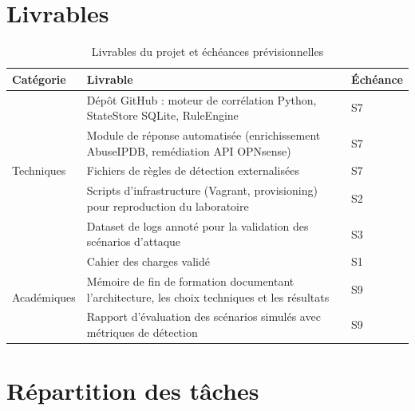 \documentclass[a4paper,12pt]{article}
\begin{document}
\section{Livrables}

\begin{table}[H]
\centering
\small
\renewcommand{\arraystretch}{1.4}
\begin{tabular}{|p{}|p{}|p{}|}
\hline
\textbf{Catégorie} & \textbf{Livrable} & \textbf{Échéance} \\
\hline
\multirow{5}{*}{Techniques}
 & Dépôt GitHub : moteur de corrélation Python, StateStore SQLite, RuleEngine & S7 \\
\cline{2-3}
 & Module de réponse automatisée (enrichissement AbuseIPDB, remédiation API OPNsense) & S7 \\
\cline{2-3}
 & Fichiers de règles de détection externalisées & S7 \\
\cline{2-3}
 & Scripts d'infrastructure (Vagrant, provisioning) pour reproduction du laboratoire & S2 \\
\cline{2-3}
 & Dataset de logs annoté pour la validation des scénarios d'attaque & S3 \\
\hline
\multirow{3}{*}{Académiques}
 & Cahier des charges validé & S1 \\
\cline{2-3}
 & Mémoire de fin de formation documentant l'architecture, les choix techniques et les résultats & S9 \\
\cline{2-3}
 & Rapport d'évaluation des scénarios simulés avec métriques de détection & S9 \\
\hline
\end{tabular}
\caption*{Livrables du projet et échéances prévisionnelles}
\end{table}

\section{Répartition des tâches}
\end{document}
